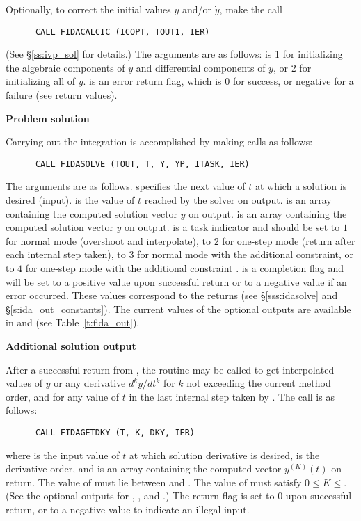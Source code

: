 \begin{Steps}
  Optionally, to correct the initial values $y$ and/or $\dot{y}$, make the call
\begin{verbatim}
      CALL FIDACALCIC (ICOPT, TOUT1, IER)
\end{verbatim}
  (See \S\ref{ss:ivp_sol} for details.)  The arguments are as follows:
   is 1 for initializing the algebraic components of $y$ and
  differential components of $\dot{y}$, or 2 for initializing all of $y$.
   is an error return flag, which is 0 for success, or negative
  for a failure (see  return values).

\item {\bf Problem solution}

  Carrying out the integration is accomplished by making calls as follows:
\begin{verbatim}
      CALL FIDASOLVE (TOUT, T, Y, YP, ITASK, IER)
\end{verbatim}
  The arguments are as follows.
   specifies the next value of $t$ at which a solution is desired (input).
   is the value of $t$ reached by the solver on output.
   is an array containing the computed solution vector $y$ on output.
   is an array containing the computed solution vector $\dot{y}$ on output.
   is a task indicator and should be set to $1$ for normal mode 
  (overshoot  and interpolate), to $2$ for one-step mode 
  (return after each internal step taken), to $3$ for normal mode with
  the additional  constraint, or to $4$ for one-step mode 
  with the additional constraint .
   is a completion flag and will be set to a positive value upon
  successful return or to a negative value if an error occurred. These values
  correspond to the  returns (see \S\ref{sss:idasolve} and \S\ref{s:ida_out_constants}).
  The current values of the optional outputs are available in  and
   (see Table~\ref{t:fida_out}).
  
\item {\bf Additional solution output}

  After a successful return from , the routine  may
  be called to get interpolated values of $y$ or any derivative $d^k y/dt^k$
  for $k$ not exceeding the current method order, and for any value of $t$ in
  the last internal step taken by {\ida}.  The call is as follows:
\begin{verbatim}
      CALL FIDAGETDKY (T, K, DKY, IER)
\end{verbatim}
  where
   is the input value of $t$ at which solution derivative is desired,
   is the derivative order, and
   is an array containing the computed vector $y^{(K)}(t)$ on return.
  The value of  must lie between  and .
  The value of  must satisfy $0 \leq K \leq $. (See the
  optional outputs for , , and .)
  The return flag  is set to $0$ upon successful return, or to a
  negative value to indicate an illegal input.
  

\end{Steps}
